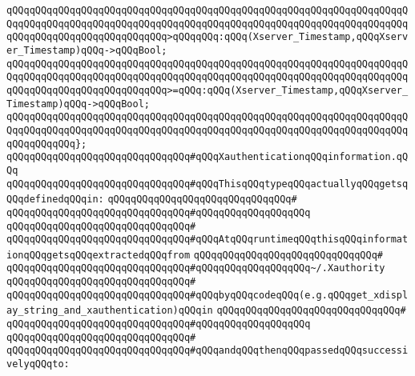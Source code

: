 \verb|qQQqqQQqqQQqqQQqqQQqqQQqqQQqqQQqqQQqqQQqqQQqqQQqqQQqqQQqqQQqqQQqqQQqqQQqqQQqqQQqqQQqqQQqqQQqqQQqqQQqqQQqqQQqqQQqqQQqqQQqqQQqqQQqqQQqqQQqqQQqqQQqqQQqqQQqqQQqqQQqqQQqqQQq>qQQqqQQq:qQQq(Xserver_Timestamp,qQQqXserver_Timestamp)qQQq->qQQqBool;|\newline
\verb|qQQqqQQqqQQqqQQqqQQqqQQqqQQqqQQqqQQqqQQqqQQqqQQqqQQqqQQqqQQqqQQqqQQqqQQqqQQqqQQqqQQqqQQqqQQqqQQqqQQqqQQqqQQqqQQqqQQqqQQqqQQqqQQqqQQqqQQqqQQqqQQqqQQqqQQqqQQqqQQqqQQqqQQq>=qQQq:qQQq(Xserver_Timestamp,qQQqXserver_Timestamp)qQQq->qQQqBool;|\newline
\verb|qQQqqQQqqQQqqQQqqQQqqQQqqQQqqQQqqQQqqQQqqQQqqQQqqQQqqQQqqQQqqQQqqQQqqQQqqQQqqQQqqQQqqQQqqQQqqQQqqQQqqQQqqQQqqQQqqQQqqQQqqQQqqQQqqQQqqQQqqQQqqQQqqQQqqQQq};|\newline
\newline
\verb|qQQqqQQqqQQqqQQqqQQqqQQqqQQqqQQq#qQQqXauthenticationqQQqinformation.qQQq|\newline
\verb|qQQqqQQqqQQqqQQqqQQqqQQqqQQqqQQq#qQQqThisqQQqtypeqQQqactuallyqQQqgetsqQQqdefinedqQQqin:|\newline
\verb|qQQqqQQqqQQqqQQqqQQqqQQqqQQqqQQq#|\newline
\verb|qQQqqQQqqQQqqQQqqQQqqQQqqQQqqQQq#qQQqqQQqqQQqqQQqqQQq|\newline
\verb|qQQqqQQqqQQqqQQqqQQqqQQqqQQqqQQq#|\newline
\verb|qQQqqQQqqQQqqQQqqQQqqQQqqQQqqQQq#qQQqAtqQQqruntimeqQQqthisqQQqinformationqQQqgetsqQQqextractedqQQqfrom|\newline
\verb|qQQqqQQqqQQqqQQqqQQqqQQqqQQqqQQq#|\newline
\verb|qQQqqQQqqQQqqQQqqQQqqQQqqQQqqQQq#qQQqqQQqqQQqqQQqqQQq~/.Xauthority|\newline
\verb|qQQqqQQqqQQqqQQqqQQqqQQqqQQqqQQq#|\newline
\verb|qQQqqQQqqQQqqQQqqQQqqQQqqQQqqQQq#qQQqbyqQQqcodeqQQq(e.g.qQQqget_xdisplay_string_and_xauthentication)qQQqin|\newline
\verb|qQQqqQQqqQQqqQQqqQQqqQQqqQQqqQQq#|\newline
\verb|qQQqqQQqqQQqqQQqqQQqqQQqqQQqqQQq#qQQqqQQqqQQqqQQqqQQq|\newline
\verb|qQQqqQQqqQQqqQQqqQQqqQQqqQQqqQQq#|\newline
\verb|qQQqqQQqqQQqqQQqqQQqqQQqqQQqqQQq#qQQqandqQQqthenqQQqpassedqQQqsuccessivelyqQQqto:|\newline
